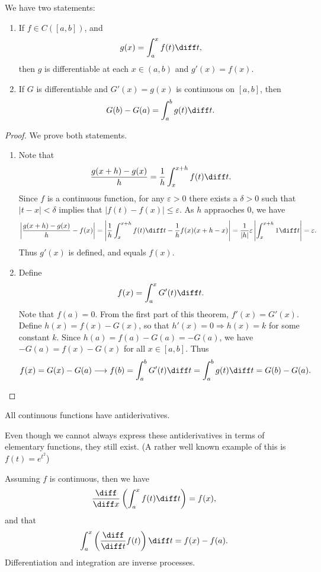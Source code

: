 \begin{theorem}
We have two statements:
\begin{enumerate}
\item If $f \in C([a,b])$, and \[ g(x) = \int_a^x f(t) \diff t, \] then $g$ is differentiable at each $x \in (a,b)$ and $g'(x) = f(x)$. 
\item If $G$ is differentiable and $G'(x) = g(x)$ is continuous on $[a,b]$, then 
\[ G(b) - G(a) = \int_a^b g(t) \diff t. \]
\end{enumerate}
\end{theorem}
\begin{proof}
We prove both statements. 
\begin{enumerate}
\item 
Note that 
\[ \dfrac{g(x+h) - g(x)}{h} = \dfrac{1}{h}\int_x^{x+h} f(t) \diff t. \] Since $f$ is a continuous function, for any $\varepsilon > 0$ there exists a $\delta > 0$ such that $|t-x|<\delta$ implies that $|f(t) - f(x)| \leq \varepsilon$. As $h$ appraoches 0, we have 
\[ \left | \dfrac{g(x+h) - g(x)}{h} - f(x) \right | = \left |\dfrac{1}{h}\int_x^{x+h} f(t) \diff t- \dfrac{1}{h}f(x)(x+h-x) \right | =  \dfrac{1}{|h|}\varepsilon \left | \int_x^{x+h} 1 \diff t \right |= \varepsilon. \]
Thus $g'(x)$ is defined, and equals $f(x)$. 

\item 
Define 
\[ f(x) = \int_a^x G'(t) \diff t. \] Note that $f(a) = 0$. From the first part of this theorem, $f'(x) = G'(x)$. Define $h(x) = f(x) - G(x)$, so that $h'(x) = 0 \Rightarrow h(x) = k$ for some constant $k$. Since $h(a) = f(a) - G(a) = -G(a)$, we have $-G(a) = f(x) - G(x)$ for all $x \in [a,b]$. Thus \[f(x) = G(x) - G(a) \longrightarrow f(b) = \displaystyle \int_a^bG'(t) \diff t = \int_a^b g(t) \diff t = G(b) - G(a). \]
\end{enumerate}
\end{proof}

\begin{corollary*}
All continuous functions have antiderivatives. 
\end{corollary*}
Even though we cannot always express these antiderivatives in terms of elementary functions, they still exist. (A rather well known example of this is $f(t) = e^{t^2}$)

\begin{remark*}
Assuming $f$ is continuous, then we have 
\[ \dfrac{\diff }{\diff x} \left ( \int_a^x f(t) \diff t \right ) = f(x), \]
and that 
\[ \int_a^x \left ( \dfrac{\diff}{\diff t} f(t)\right ) \diff t = f(x) - f(a). \]
Differentiation and integration are inverse processes. 
\end{remark*}

